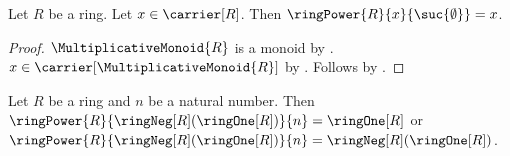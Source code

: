 \begin{proposition}\label{ring_power_one}
    Let $R$ be a ring.
    Let $x\in\carrier[R]$.
    Then $\ringPower{R}{x}{\suc{\emptyset}}=x$.
\end{proposition}
\begin{proof}
    $\MultiplicativeMonoid{R}$ is a monoid by
        .
    $x\in\carrier[\MultiplicativeMonoid{R}]$ by
        .
    Follows by .
\end{proof}

\begin{theorem}\label{ring_power_of_negative_one}
    Let $R$ be a ring and $n$ be a natural number.
    Then $\ringPower{R}{\ringNeg[R](\ringOne[R])}{n}=\ringOne[R]$ or
        $\ringPower{R}{\ringNeg[R](\ringOne[R])}{n}
            =\ringNeg[R](\ringOne[R])$.
\end{theorem}
